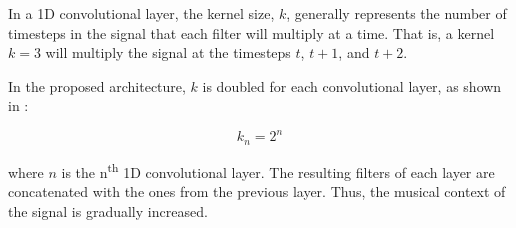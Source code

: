 
In a 1D convolutional layer, the kernel size, $k$, generally
represents the number of timesteps in the signal that each
filter will multiply at a time. That is, a kernel $k=3$ will
multiply the signal at the timesteps $t$, $t+1$, and $t+2$.

In the proposed architecture, $k$ is doubled for each
convolutional layer, as shown in :

\begin{equation}
    \label{eq:kernel_size}
    k_n = 2^{n}
\end{equation}

where $n$ is the n\textsuperscript{th} 1D convolutional
layer. The resulting filters of each layer are concatenated
with the ones from the previous layer. Thus, the musical
context of the signal is gradually increased.
